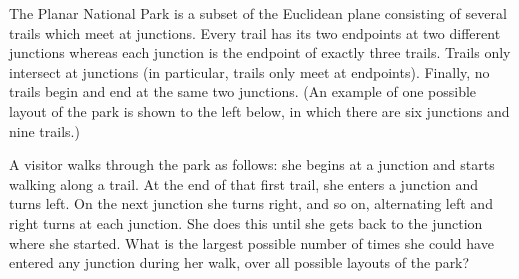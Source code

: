 The Planar National Park is a subset of the Euclidean plane consisting of several trails which meet at junctions. Every trail has its two endpoints at two different junctions whereas each junction is the endpoint of exactly three trails. Trails only intersect at junctions (in particular, trails only meet at endpoints). Finally, no trails begin and end at the same two junctions. (An example of one possible layout of the park is shown to the left below, in which there are six junctions and nine trails.)



A visitor walks through the park as follows: she begins at a junction and starts walking along a trail. At the end of that first trail, she enters a junction and turns left. On the next junction she turns right, and so on, alternating left and right turns at each junction. She does this until she gets back to the junction where she started. What is the largest possible number of times she could have entered any junction during her walk, over all possible layouts of the park?